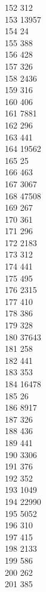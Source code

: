 { 152	312 \\
 153	13957 \\
 154	24 \\
 155	388 \\
 156	428 \\
 157	326 \\
 158	2436 \\
 159	316 \\
 160	406 \\
 161	7881 \\
 162	296 \\
 163	441 \\
 164	19562 \\
 165	25 \\
 166	463 \\
 167	3067 \\
 168	47508 \\
 169	267 \\
 170	361 \\
 171	296 \\
 172	2183 \\
 173	312 \\
 174	441 \\
 175	495 \\
 176	2315 \\
 177	410 \\
 178	386 \\
 179	328 \\
 180	37643 \\
 181	258 \\
 182	441 \\
 183	353 \\
 184	16478 \\
 185	26 \\
 186	8917 \\
 187	326 \\
 188	436 \\
 189	441 \\
 190	3306 \\
 191	376 \\
 192	352 \\
 193	1049 \\
 194	22990 \\
 195	5052 \\
 196	310 \\
 197	415 \\
 198	2133 \\
 199	586 \\
 200	262 \\
 201	385 \\
}
